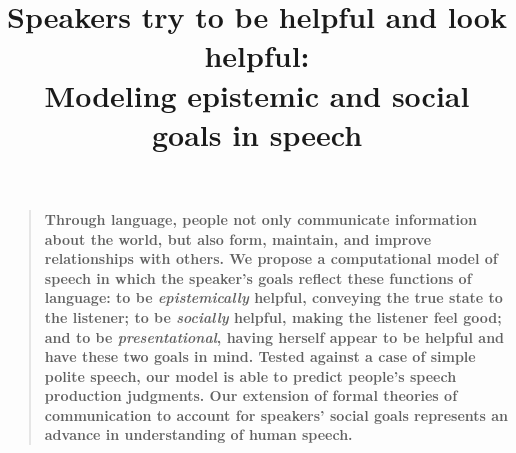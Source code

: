 \documentclass[12pt]{article}
\title{Speakers try to be helpful and look helpful: \\ Modeling epistemic and social goals in speech}
\author
%
{Erica J. Yoon,$^{1\ast\dagger}$ Michael Henry Tessler,$^{1\ast}$ Noah D. Goodman,$^{1}$ Michael C. Frank$^{1}$\\
\\
\normalsize{$^{1}$Department of Psychology, Stanford University,}\\
\normalsize{450 Serra Mall, Stanford, CA 94305.}
\\
\normalsize{$^\ast$These authors contributed equally to this work.}
\\
\normalsize{$^\dagger$To whom correspondence should be addressed; E-mail: ejyoon@stanford.edu.}
}
\date{}
\newenvironment{sciabstract}{%
\begin{quote} \bf}
{\end{quote}}
\begin{document}
 


\baselineskip24pt


\maketitle 






\begin{sciabstract}
Through language, people not only communicate information about the world, 
but also form, maintain, and improve relationships with others.
We propose a computational model of speech 
in which the speaker's goals reflect these functions of language:
to be \emph{epistemically} helpful, conveying the true state to the listener;
to be \emph{socially} helpful, making the listener feel good; and
to be \emph{presentational}, having herself appear to be helpful and have these two goals in mind. 
Tested against a case of simple polite speech, our model is able to predict people's speech production judgments. 
Our extension of formal theories of communication to account for speakers' social
goals represents an advance in understanding of human speech.
\end{sciabstract}
\end{document}
